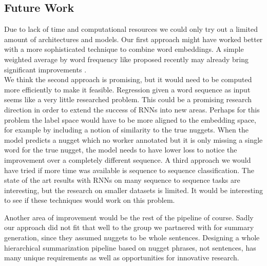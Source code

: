 \subsection{Future Work}
Due to lack of time and computational resources we could only try out a  limited amount of architectures and models.
Our first approach might have worked better with a more sophisticated technique to combine word embeddings. A simple weighted average by word frequency like proposed recently may already bring significant improvements \cite{sif2016}.\\
We think the second approach is promising, but it would need to be computed more efficiently to make it feasible. Regression given a word sequence as input seems like a very little researched problem. This could be a promising research direction in order to extend the success of RNNs into new areas. Perhaps for this problem the label space would have to be more aligned to the embedding space, for example by including a notion of similarity to the true nuggets. When the model predicts a nugget which no worker annotated but it is only missing a single word for the true nugget, the model needs to have lower loss to notice the improvement over a completely different sequence.
A third approach we would have tried if more time was available is sequence to sequence classification. The state of the art results with RNNs on many sequence to sequence tasks are interesting, but the research on smaller datasets is limited. It would be interesting to see if these techniques would work on this problem.

Another area of improvement would be the rest of the pipeline of course. Sadly our approach did not fit that well to the group we partnered with for summary generation, since they assumed nuggets to be whole sentences. Designing a whole hierarchical summarization pipeline based on nugget phrases, not sentences, has many unique requirements as well as opportunities for innovative research.